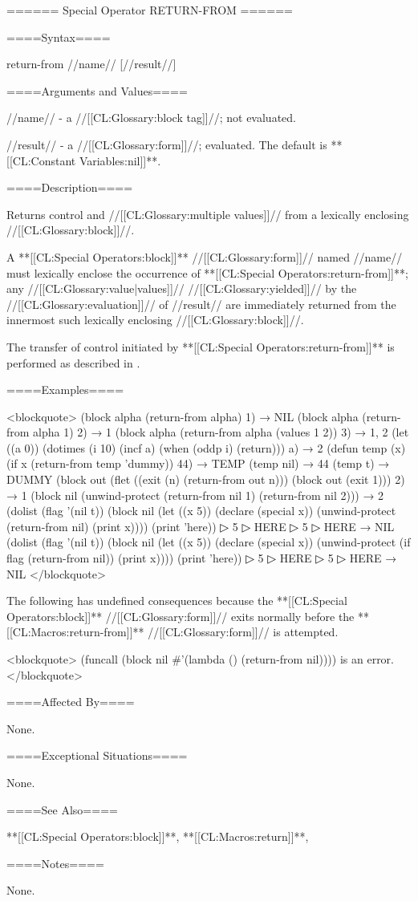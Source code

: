 ====== Special Operator RETURN-FROM ======

====Syntax====

\DefspecNoReturn return-from {//name// [//result//]}

====Arguments and Values====

//name// - a //[[CL:Glossary:block tag]]//; not evaluated.

//result// - a //[[CL:Glossary:form]]//; evaluated. The default is **[[CL:Constant Variables:nil]]**.

====Description====

Returns control and //[[CL:Glossary:multiple values]]// from a lexically enclosing //[[CL:Glossary:block]]//.

A **[[CL:Special Operators:block]]** //[[CL:Glossary:form]]// named //name// must lexically enclose the occurrence of **[[CL:Special Operators:return-from]]**; any //[[CL:Glossary:value|values]]// //[[CL:Glossary:yielded]]// by the //[[CL:Glossary:evaluation]]// of //result// are immediately returned from the innermost such lexically enclosing //[[CL:Glossary:block]]//.

The transfer of control initiated by **[[CL:Special Operators:return-from]]** is performed as described in \secref\TransferOfControl.

====Examples====

<blockquote> (block alpha (return-from alpha) 1) → NIL (block alpha (return-from alpha 1) 2) → 1 (block alpha (return-from alpha (values 1 2)) 3) → 1, 2 (let ((a 0)) (dotimes (i 10) (incf a) (when (oddp i) (return))) a) → 2 (defun temp (x) (if x (return-from temp 'dummy)) 44) → TEMP (temp nil) → 44 (temp t) → DUMMY (block out (flet ((exit (n) (return-from out n))) (block out (exit 1))) 2) → 1 (block nil (unwind-protect (return-from nil 1) (return-from nil 2))) → 2 (dolist (flag '(nil t)) (block nil (let ((x 5)) (declare (special x)) (unwind-protect (return-from nil) (print x)))) (print 'here))
▷ 5
▷ HERE
▷ 5
▷ HERE → NIL (dolist (flag '(nil t)) (block nil (let ((x 5)) (declare (special x)) (unwind-protect (if flag (return-from nil)) (print x)))) (print 'here))
▷ 5
▷ HERE
▷ 5
▷ HERE → NIL </blockquote>

The following has undefined consequences because the **[[CL:Special Operators:block]]** //[[CL:Glossary:form]]// exits normally before the **[[CL:Macros:return-from]]** //[[CL:Glossary:form]]// is attempted.

<blockquote> (funcall (block nil #'(lambda () (return-from nil)))) is an error. </blockquote>

====Affected By====

None.

====Exceptional Situations====

None.

====See Also====

**[[CL:Special Operators:block]]**, **[[CL:Macros:return]]**, {\secref\Evaluation}

====Notes====

None.

